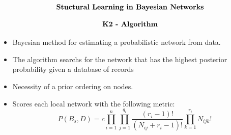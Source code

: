 \begin{frame}
    \begin{align*}
        \centering \textbf{ Stuctural Learning in Bayesian Networks}
    \end{align*}    
\end{frame}


\begin{frame}
    \begin{align*}
        \centering \textbf{ K2 - Algorithm}
    \end{align*}
    
    \begin{itemize}
        \item {Bayesian method for estimating a probabilistic network from data.}

        \item {The algorithm searchs for the network that has the highest posterior probability given a database of records}
        \item {Necessity of a prior ordering on nodes.}
        \item { Scores each local network with the following metric:
        \begin{equation}
            P(B_s, D) = c \prod_{i=1}^{n}\prod_{j=1}^{q_{i}}\frac{(r_i - 1)!}{(N_{ij} + r_i -1)!}\prod_{k=1}^{r_i}N_{ijk}!
         \label{eq:cooper-metric-gen}
        \end{equation}
        }
    \end{itemize}
    
\end{frame}

